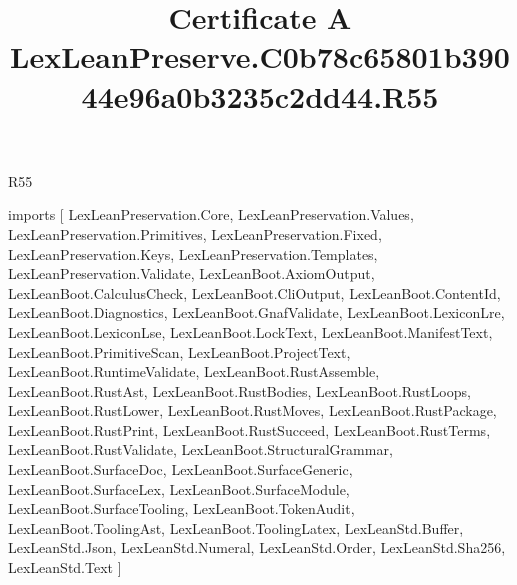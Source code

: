 \begin{lexlean}{R55}
\title{Certificate A LexLeanPreserve.C0b78c65801b39044e96a0b3235c2dd44.R55}
\begin{coremodule}
imports [
  LexLeanPreservation.Core,
  LexLeanPreservation.Values,
  LexLeanPreservation.Primitives,
  LexLeanPreservation.Fixed,
  LexLeanPreservation.Keys,
  LexLeanPreservation.Templates,
  LexLeanPreservation.Validate,
  LexLeanBoot.AxiomOutput,
  LexLeanBoot.CalculusCheck,
  LexLeanBoot.CliOutput,
  LexLeanBoot.ContentId,
  LexLeanBoot.Diagnostics,
  LexLeanBoot.GnafValidate,
  LexLeanBoot.LexiconLre,
  LexLeanBoot.LexiconLse,
  LexLeanBoot.LockText,
  LexLeanBoot.ManifestText,
  LexLeanBoot.PrimitiveScan,
  LexLeanBoot.ProjectText,
  LexLeanBoot.RuntimeValidate,
  LexLeanBoot.RustAssemble,
  LexLeanBoot.RustAst,
  LexLeanBoot.RustBodies,
  LexLeanBoot.RustLoops,
  LexLeanBoot.RustLower,
  LexLeanBoot.RustMoves,
  LexLeanBoot.RustPackage,
  LexLeanBoot.RustPrint,
  LexLeanBoot.RustSucceed,
  LexLeanBoot.RustTerms,
  LexLeanBoot.RustValidate,
  LexLeanBoot.StructuralGrammar,
  LexLeanBoot.SurfaceDoc,
  LexLeanBoot.SurfaceGeneric,
  LexLeanBoot.SurfaceLex,
  LexLeanBoot.SurfaceModule,
  LexLeanBoot.SurfaceTooling,
  LexLeanBoot.TokenAudit,
  LexLeanBoot.ToolingAst,
  LexLeanBoot.ToolingLatex,
  LexLeanStd.Buffer,
  LexLeanStd.Json,
  LexLeanStd.Numeral,
  LexLeanStd.Order,
  LexLeanStd.Sha256,
  LexLeanStd.Text
]


\end{coremodule}
\end{lexlean}
